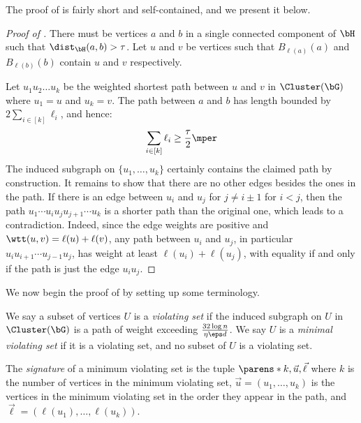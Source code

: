 \documentclass[11pt,letterpaper]{article}
\begin{document}
    The proof of  is fairly short and self-contained, and we present it below.
    \begin{proof}[Proof of ]
        There must be vertices $a$ and $b$ in a single connected component of $\bH$ such that $\dist_{\bH}(a,b) > \tau$.
        Let $u$ and $v$ be vertices such that $B_{\ell(a)}(a)$ and $B_{\ell(b)}(b)$ contain $u$ and $v$ respectively.

        Let $u_1u_2\dots u_k$ be the weighted shortest path between $u$ and $v$ in $\Cluster(\bG)$ where $u_1 = u$ and $u_k = v$. 
        The path between $a$ and $b$ has length bounded by $2\sum_{i\in[k]}\ell_i$, and hence:
        \[
            \sum_{i\in[k]} \ell_i \ge \frac{\tau}{2}\mper
        \]
        The induced subgraph on $\{u_1,\dots,u_k\}$ certainly contains the claimed path by construction.
        It remains to show that there are no other edges besides the ones in the path.
        If there is an edge between $u_i$ and $u_j$ for $j\ne i\pm 1$ for $i < j$, then the path $u_1\cdots u_i u_j u_{j+1} \cdots u_k$ is a shorter path than the original one, which leads to a contradiction.
        Indeed, since the edge weights are positive and $\wtt(u, v) = \ell(u) + \ell(v)$, any path between $u_i$ and $u_j$, in particular $u_i u_{i+1} \cdots u_{j-1} u_j$, has weight at least $\ell(u_i) + \ell(u_j)$, with equality if and only if the path is just the edge $u_iu_j$.
    \end{proof}

    We now begin the proof of  by setting up some terminology.
    \begin{definition}
        We say a subset of vertices $U$ is a \emph{violating set} if the induced subgraph on $U$ in $\Cluster(\bG)$ is a path of weight exceeding $\tfrac{32\log n}{\eta\eps d}$.
        We say $U$ is a \emph{minimal violating set} if it is a violating set, and no subset of $U$ is a violating set.
    \end{definition}

    \begin{definition}[Signature]
        The \emph{signature} of a minimum violating set is the tuple $\parens*{k,\vec{u},\vec{\ell}}$ where $k$ is the number of vertices in the minimum violating set, $\vec{u} = (u_1,\dots,u_k)$ is the vertices in the minimum violating set in the order they appear in the path, and $\vec{\ell} = (\ell(u_1),\dots,\ell(u_k))$.
    \end{definition}
\end{document}
